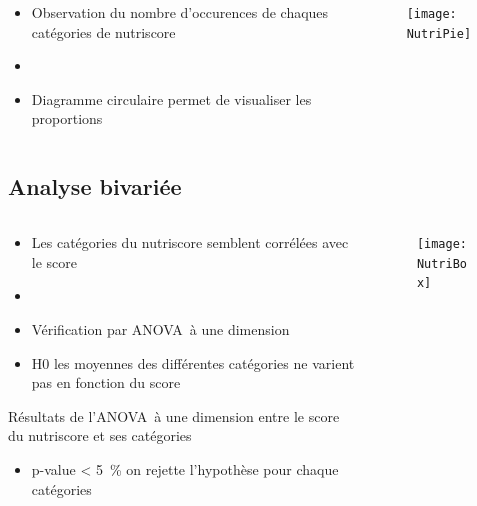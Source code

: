 \begin{frame}{\insertsubsection}
  \begin{columns}
    \begin{column}{.5\textwidth}
      \begin{itemize}
        \item Observation du nombre d'occurences de chaques catégories de nutriscore
        \item[]
        \item Diagramme circulaire permet de visualiser les proportions
      \end{itemize}
    \end{column}
    \begin{column}{.5\textwidth}
      \begin{figure}
        \texttt{[image: NutriPie]}
      \end{figure}
    \end{column}
  \end{columns}
\end{frame}

\subsection{Analyse bivariée}
\begin{frame}{\insertsubsection}
  \begin{columns}
    \begin{column}{.55\textwidth}
      \begin{itemize}
        \item Les catégories du nutriscore semblent corrélées avec le score
        \item[]
        \item Vérification par ANOVA à une dimension
        \item H0 les moyennes des différentes catégories ne varient pas en fonction du score
      \end{itemize}
      \begin{table}
        \tiny
        
        \caption{Résultats de l'ANOVA à une dimension entre le score du nutriscore et ses catégories}
      \end{table}
      \begin{itemize}
        \item p-value \qty{< 5}{\percent} on rejette l'hypothèse pour chaque catégories
      \end{itemize}
    \end{column}
    \begin{column}{.45\textwidth}
      \begin{figure}
        \texttt{[image: NutriBox]}
      \end{figure}
    \end{column}
  \end{columns}
\end{frame}


